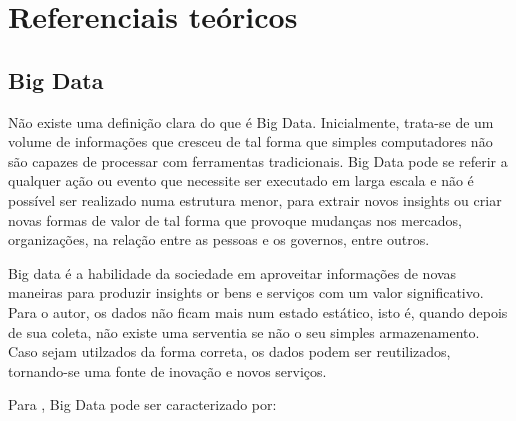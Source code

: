 \part{Referenciais teóricos}

\chapter{Big Data}

Não existe uma definição clara do que é Big Data. Inicialmente, trata-se de um volume de informações que cresceu de tal forma que simples computadores não são capazes de processar com ferramentas tradicionais\cite[p. 6]{CUKIER}. Big Data pode se referir a qualquer ação ou evento que necessite ser executado em larga escala e não é possível ser realizado numa estrutura menor, para extrair novos insights ou criar novas formas de valor de tal forma que provoque mudanças nos mercados, organizações, na relação entre as pessoas e os governos, entre outros.


Big data é a habilidade da sociedade em aproveitar informações de novas maneiras para produzir insights or bens e serviços com um valor significativo\cite[p. 2]{CUKIER}. Para o autor, os dados não ficam mais num estado estático, isto é, quando depois de sua coleta, não existe uma serventia se não o seu simples armazenamento. Caso sejam utilzados da forma correta, os dados podem ser reutilizados, tornando-se uma fonte de inovação e novos serviços.

Para \cite[p. 5]{ZIKO}, Big Data pode ser caracterizado por:

